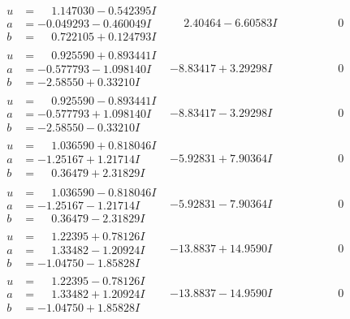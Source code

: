 \documentclass[1p]{elsarticle_modified}
\theoremstyle{definition}
\begin{document}
$$\begin{array}{c|c|c}
\begin{aligned}
u &= \phantom{-}1.147030 - 0.542395 I \\
a &= -0.049293 - 0.460049 I \\
b &= \phantom{-}0.722105 + 0.124793 I\end{aligned}
 & \phantom{-}2.40464 - 6.60583 I & \phantom{-0.000000 } 0 \\ \hline\begin{aligned}
u &= \phantom{-}0.925590 + 0.893441 I \\
a &= -0.577793 - 1.098140 I \\
b &= -2.58550 + 0.33210 I\end{aligned}
 & -8.83417 + 3.29298 I & \phantom{-0.000000 } 0 \\ \hline\begin{aligned}
u &= \phantom{-}0.925590 - 0.893441 I \\
a &= -0.577793 + 1.098140 I \\
b &= -2.58550 - 0.33210 I\end{aligned}
 & -8.83417 - 3.29298 I & \phantom{-0.000000 } 0 \\ \hline\begin{aligned}
u &= \phantom{-}1.036590 + 0.818046 I \\
a &= -1.25167 + 1.21714 I \\
b &= \phantom{-}0.36479 + 2.31829 I\end{aligned}
 & -5.92831 + 7.90364 I & \phantom{-0.000000 } 0 \\ \hline\begin{aligned}
u &= \phantom{-}1.036590 - 0.818046 I \\
a &= -1.25167 - 1.21714 I \\
b &= \phantom{-}0.36479 - 2.31829 I\end{aligned}
 & -5.92831 - 7.90364 I & \phantom{-0.000000 } 0 \\ \hline\begin{aligned}
u &= \phantom{-}1.22395 + 0.78126 I \\
a &= \phantom{-}1.33482 - 1.20924 I \\
b &= -1.04750 - 1.85828 I\end{aligned}
 & -13.8837 + 14.9590 I & \phantom{-0.000000 } 0 \\ \hline\begin{aligned}
u &= \phantom{-}1.22395 - 0.78126 I \\
a &= \phantom{-}1.33482 + 1.20924 I \\
b &= -1.04750 + 1.85828 I\end{aligned}
 & -13.8837 - 14.9590 I & \phantom{-0.000000 } 0 \\ \hline\begin{aligned}

\end{aligned}
\end{array}$$
\end{document}
